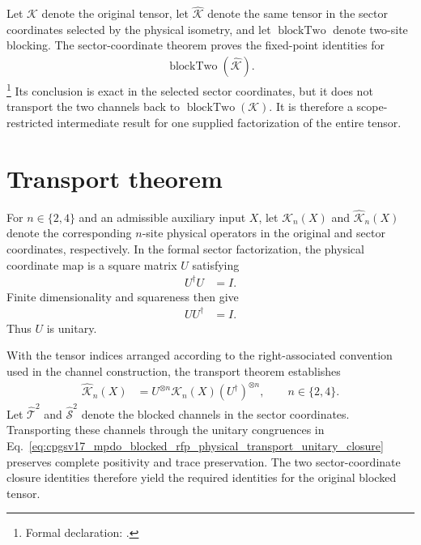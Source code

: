 \documentclass{article}
\begin{document}
Let $\mathcal K$ denote the original tensor, let $\widehat{\mathcal K}$ denote
the same tensor in the sector coordinates selected by the physical isometry,
and let $\operatorname{blockTwo}$ denote two-site blocking. The
sector-coordinate theorem proves the fixed-point identities for
\begin{align}
    \operatorname{blockTwo}(\widehat{\mathcal K}).
    \label{eq:cpgsv17_mpdo_blocked_rfp_physical_transport_sector_block}
\end{align}
\footnote{Formal declaration:
.}
Its conclusion is exact in the selected sector coordinates, but it does not
transport the two channels back to
$\operatorname{blockTwo}(\mathcal K)$. It is therefore a scope-restricted
intermediate result for one supplied factorization of the entire tensor.

\section{Transport theorem}

For $n\in\{2,4\}$ and an admissible auxiliary input $X$, let
$\mathcal K_n(X)$ and $\widehat{\mathcal K}_n(X)$ denote the corresponding
$n$-site physical operators in the original and sector coordinates,
respectively. In the formal sector factorization, the physical coordinate map
is a square matrix $U$ satisfying
\begin{align}
    U^\dagger U
        &= I.
    \label{eq:cpgsv17_mpdo_blocked_rfp_physical_transport_isometry}
\end{align}
Finite dimensionality and squareness then give
\begin{align}
    UU^\dagger
        &= I.
    \label{eq:cpgsv17_mpdo_blocked_rfp_physical_transport_coisometry}
\end{align}
Thus $U$ is unitary.

With the tensor indices arranged according to the right-associated convention
used in the channel construction, the transport theorem establishes
\begin{align}
    \widehat{\mathcal K}_n(X)
        &= U^{\otimes n}\mathcal K_n(X)(U^\dagger)^{\otimes n},
        \qquad n\in\{2,4\}.
    \label{eq:cpgsv17_mpdo_blocked_rfp_physical_transport_unitary_closure}
\end{align}
Let $\widehat{\mathcal T}^2$ and $\widehat{\mathcal S}^2$ denote the blocked
channels in the sector coordinates. Transporting these channels through the
unitary congruences in
Eq.~\ref{eq:cpgsv17_mpdo_blocked_rfp_physical_transport_unitary_closure}
preserves complete positivity and trace preservation. The two
sector-coordinate closure identities therefore yield the required identities
for the original blocked tensor.
\end{document}
